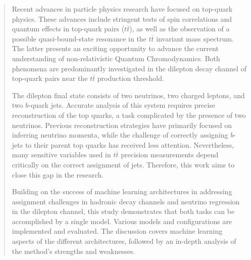 \documentclass[master,
  oneside,
  BCOR=10mm,
  ngerman,
  english,
  final,%
]{GAUBM}
\begin{document}



\frontmatter
\maketitle
\cleardoublepage
\begin{abstract}
  \noindent Recent advances in particle physics research have focused on top-quark physics. These advances include stringent tests of spin correlations and quantum effects in top-quark pairs ($t\bar{t}$), as well as the observation of a possible quasi-bound-state resonance in the $t\bar{t}$ invariant mass spectrum. The latter presents an exciting opportunity to advance the current understanding of non-relativistic Quantum Chromodynamics. Both phenomena are predominantly investigated in the dilepton decay channel of top-quark pairs near the $t\bar{t}$ production threshold.

  The dilepton final state consists of two neutrinos, two charged leptons, and two $b$-quark jets. Accurate analysis of this system requires precise reconstruction of the top quarks, a task complicated by the presence of two neutrinos. Previous reconstruction strategies have primarily focused on inferring neutrino momenta, while the challenge of correctly assigning $b$-jets to their parent top quarks has received less attention. Nevertheless, many sensitive variables used in $t\bar{t}$ precision measurements depend critically on the correct assignment of jets. Therefore, this work aims to close this gap in the research.

  Building on the success of machine learning architectures in addressing assignment challenges in hadronic decay channels and neutrino regression in the dilepton channel, this study demonstrates that both tasks can be accomplished by a single model. Various models and configurations are implemented and evaluated. The discussion covers machine learning aspects of the different architectures, followed by an in-depth analysis of the method's strengths and weaknesses. 
  

\end{abstract}
\end{document}
